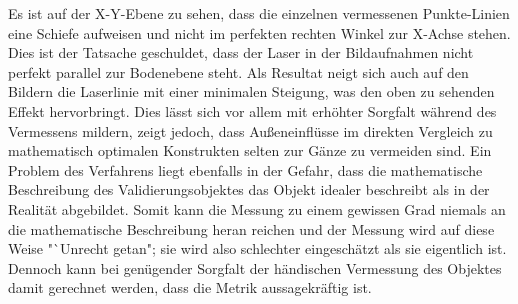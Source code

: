 Es ist auf der X-Y-Ebene zu sehen, dass die einzelnen vermessenen Punkte-Linien eine Schiefe aufweisen und nicht im perfekten rechten Winkel zur X-Achse stehen. Dies ist der Tatsache geschuldet, dass der Laser in der Bildaufnahmen nicht perfekt parallel zur Bodenebene steht. Als Resultat neigt sich auch auf den Bildern die Laserlinie mit einer minimalen Steigung, was den oben zu sehenden Effekt hervorbringt. Dies lässt sich vor allem mit erhöhter Sorgfalt während des Vermessens mildern, zeigt jedoch, dass Außeneinflüsse im direkten Vergleich zu mathematisch optimalen Konstrukten selten zur Gänze zu vermeiden sind.\linebreak
Ein Problem des Verfahrens liegt ebenfalls in der Gefahr, dass die mathematische Beschreibung des Validierungsobjektes das Objekt idealer beschreibt als in der Realität abgebildet. Somit kann die Messung zu einem gewissen Grad niemals an die mathematische Beschreibung heran reichen und der Messung wird auf diese Weise "`Unrecht getan"; sie wird also schlechter eingeschätzt als sie eigentlich ist. Dennoch kann bei genügender Sorgfalt der händischen Vermessung des Objektes damit gerechnet werden, dass die Metrik aussagekräftig ist.